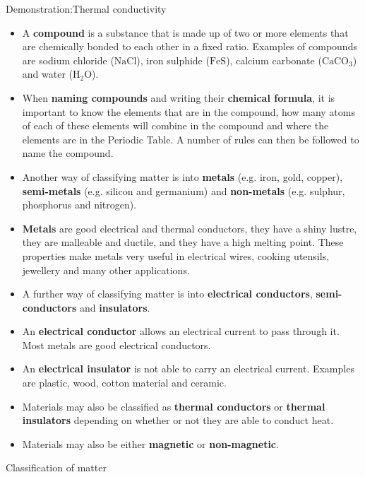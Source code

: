 \begin{gexperiment}{Demonstration:Thermal conductivity}
\begin{itemize}[noitemsep]
\label{m38706*uid124}\item A \textbf{compound} is a substance that is made up of two or more elements that are chemically bonded to each other in a fixed ratio. Examples of compounds are sodium chloride ($\mathrm{NaCl}$), iron sulphide ($\mathrm{FeS}$), calcium carbonate (${\mathrm{CaCO}}_{3}$) and water (${\mathrm{H}}_{2}\mathrm{O}$).
\label{m38706*uid125}\item When \textbf{naming compounds} and writing their \textbf{chemical formula}, it is important to know the elements that are in the compound, how many atoms of each of these elements will combine in the compound and where the elements are in the Periodic Table. A number of rules can then be followed to name the compound.
\label{m38706*uid126}\item Another way of classifying matter is into \textbf{metals} (e.g. iron, gold, copper), \textbf{semi-metals} (e.g. silicon and germanium) and \textbf{non-metals} (e.g. sulphur, phosphorus and nitrogen).
\label{m38706*uid127}\item \textbf{Metals} are good electrical and thermal conductors, they have a shiny lustre, they are malleable and ductile, and they have a high melting point. These properties make metals very useful in electrical wires, cooking utensils, jewellery and many other applications.
\label{m38706*uid128}\item A further way of classifying matter is into \textbf{electrical conductors}, \textbf{semi-conductors} and \textbf{insulators}.
\label{m38706*uid129}\item An \textbf{electrical conductor} allows an electrical current to pass through it. Most metals are good electrical conductors.
\label{m38706*uid130}\item An \textbf{electrical insulator} is not able to carry an electrical current. Examples are plastic, wood, cotton material and ceramic.
\label{m38706*uid131}\item Materials may also be classified as \textbf{thermal conductors} or \textbf{thermal insulators} depending on whether or not they are able to conduct heat.
\label{m38706*uid132}\item Materials may also be either \textbf{magnetic} or \textbf{non-magnetic}.
\end{itemize}
\label{m38706*secfhsst!!!underscore!!!id672}
            \begin{eocexercises}{Classification of matter }{
            \nopagebreak
      \label{m38706*id67920}\begin{enumerate}[noitemsep, label=\textbf{\arabic*}. ] 

\end{enumerate}}
\end{eocexercises}
\end{gexperiment}
